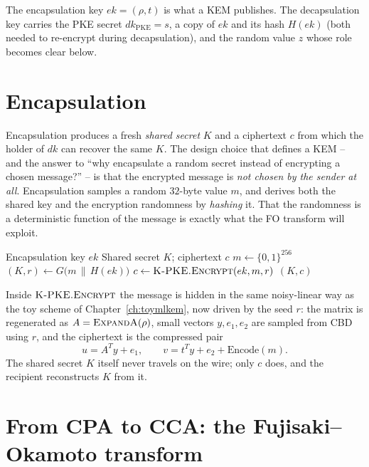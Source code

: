 The encapsulation key $ek=(\rho,t)$ is what a KEM publishes. The decapsulation key carries the PKE secret $dk_{\mathrm{PKE}}=s$, a copy of $ek$ and its hash $H(ek)$ (both needed to re-encrypt during decapsulation), and the random value $z$ whose role becomes clear below.

\section{Encapsulation}

Encapsulation produces a fresh \emph{shared secret} $K$ and a ciphertext $c$ from which the holder of $dk$ can recover the same $K$. The design choice that defines a KEM -- and the answer to ``why encapsulate a random secret instead of encrypting a chosen message?'' -- is that the encrypted message is \emph{not chosen by the sender at all}. Encapsulation samples a random $32$-byte value $m$, and derives both the shared key and the encryption randomness by \emph{hashing} it. That the randomness is a deterministic function of the message is exactly what the FO transform will exploit.

\begin{algorithm}[H]
\caption{ML-KEM.Encaps (teaching form)}
\label{alg:mlkem-encaps}
\begin{algorithmic}[1]
\Require Encapsulation key $ek$
\Ensure Shared secret $K$; ciphertext $c$
\State $m \gets \{0,1\}^{256}$ 
\State $(K, r) \gets G\big(m \,\|\, H(ek)\big)$ 
\State $c \gets \textsc{K-PKE.Encrypt}(ek, m, r)$
\State \Return $(K, c)$
\end{algorithmic}
\end{algorithm}

Inside $\textsc{K-PKE.Encrypt}$ the message is hidden in the same noisy-linear way as the toy scheme of Chapter~\ref{ch:toymlkem}, now driven by the seed $r$: the matrix is regenerated as $A=\textsc{ExpandA}(\rho)$, small vectors $y,e_1,e_2$ are sampled from CBD using $r$, and the ciphertext is the compressed pair
\[
u = A^{T} y + e_1, \qquad v = t^{T} y + e_2 + \mathrm{Encode}(m).
\]
The shared secret $K$ itself never travels on the wire; only $c$ does, and the recipient reconstructs $K$ from it.

\section{From CPA to CCA: the Fujisaki--Okamoto transform}
\label{sec:fo}

